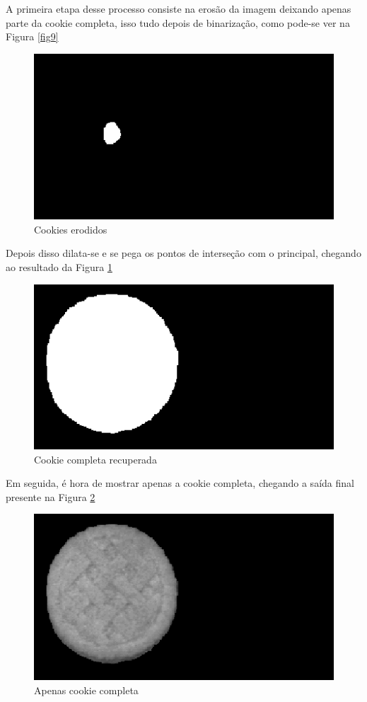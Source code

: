 \documentclass[conference]{IEEEtran}
\begin{document}
A primeira etapa desse processo consiste na erosão da imagem deixando apenas parte
da cookie completa, isso tudo depois de binarização, como pode-se ver na Figura \ref{fig9}
\begin{figure}[h]
    \centering
    \includegraphics[scale=0.6]{data/erode3.png}
    \caption{Cookies erodidos}
    \label{fig10}
\end{figure}

Depois disso dilata-se e se pega os pontos de interseção com o principal, chegando
ao resultado da Figura \ref{fig10}
\begin{figure}[!ht]
    \centering
    \includegraphics[scale=0.6]{data/recover3.png}
    \caption{Cookie completa recuperada}
    \label{fig11}
\end{figure}

Em seguida, é hora de mostrar apenas a cookie completa, chegando
a saída final presente na Figura \ref{fig11}
\begin{figure}[!th]
    \centering
    \includegraphics[scale=0.6]{data/completed3.png}
    \caption{Apenas cookie completa}
    \label{fig12}
\end{figure}
\end{document}
